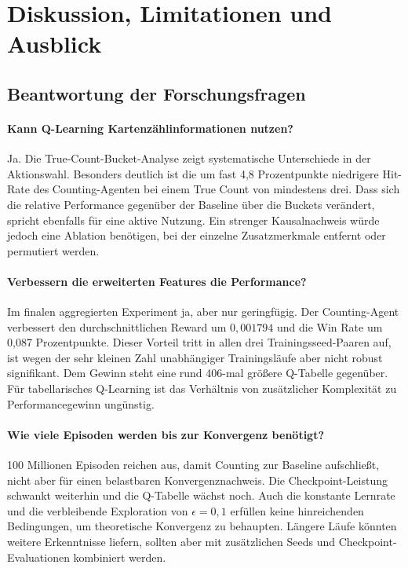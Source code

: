 \section{Diskussion, Limitationen und Ausblick}
\label{sec:diskussion}

\subsection{Beantwortung der Forschungsfragen}

\paragraph{Kann Q-Learning Kartenzählinformationen nutzen?}
Ja. Die True-Count-Bucket-Analyse zeigt systematische Unterschiede in
der Aktionswahl. Besonders deutlich ist die um fast 4,8 Prozentpunkte
niedrigere Hit-Rate des Counting-Agenten bei einem True Count von
mindestens drei. Dass sich die relative Performance gegenüber der
Baseline über die Buckets verändert, spricht ebenfalls für eine
aktive Nutzung. Ein strenger Kausalnachweis würde jedoch eine
Ablation benötigen, bei der einzelne Zusatzmerkmale entfernt oder
permutiert werden.

\paragraph{Verbessern die erweiterten Features die Performance?}
Im finalen aggregierten Experiment ja, aber nur geringfügig. Der
Counting-Agent verbessert den durchschnittlichen Reward um
$0{,}001794$ und die Win Rate um 0,087 Prozentpunkte. Dieser Vorteil
tritt in allen drei Trainingsseed-Paaren auf, ist wegen der sehr
kleinen Zahl unabhängiger Trainingsläufe aber nicht robust
signifikant. Dem Gewinn steht eine rund 406-mal größere Q-Tabelle
gegenüber. Für tabellarisches Q-Learning ist das Verhältnis von
zusätzlicher Komplexität zu Performancegewinn ungünstig.

\paragraph{Wie viele Episoden werden bis zur Konvergenz benötigt?}
100 Millionen Episoden reichen aus, damit Counting zur Baseline
aufschließt, nicht aber für einen belastbaren Konvergenznachweis. Die
Checkpoint-Leistung schwankt weiterhin und die Q-Tabelle wächst noch.
Auch die konstante Lernrate und die verbleibende Exploration von
$\epsilon=0{,}1$ erfüllen keine hinreichenden Bedingungen, um
theoretische Konvergenz zu behaupten. Längere Läufe könnten weitere
Erkenntnisse liefern, sollten aber mit zusätzlichen Seeds und
Checkpoint-Evaluationen kombiniert werden.

